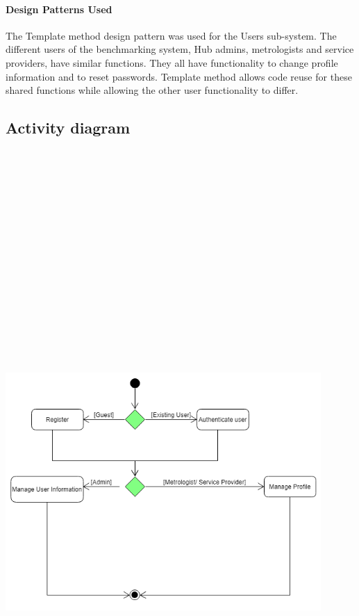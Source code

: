 	\paragraph{Design Patterns Used} 
	The Template method design pattern was used for the Users sub-system. The different users of the benchmarking system, Hub admins, metrologists and service providers, have similar functions. They all have functionality to change profile information and to reset passwords. Template method allows code reuse for these shared functions while allowing the other user functionality to differ.
	
		
\subsection{Activity diagram}
    \includegraphics[width=12cm,height=26cm,keepaspectratio]{users_unit/images/users_activity_diagram.png}
